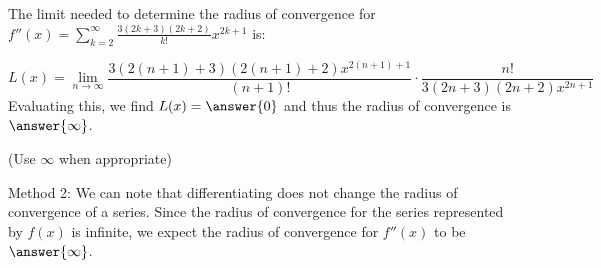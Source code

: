 \documentclass{ximera}
\begin{document}
\begin{exercise}
\begin{exercise}
\begin{exercise}
\begin{exercise}
The limit needed to determine the radius of convergence for $f''(x) = \sum_{k=2}^{\infty} \frac{3(2k+3)(2k+2)}{k!}x^{2k+1}$ is:

\[
L(x) = \lim_{n \to \infty} \frac{3(2(n+1)+3)(2(n+1)+2)x^{2(n+1)+1}}{(n+1)!} \cdot \frac{n!}{3(2n+3)(2n+2)x^{2n+1}}
\]
Evaluating this, we find $L(x) = \answer{0}$ and thus the radius of convergence is $\answer{\infty}$.

(Use $\infty$ when appropriate)
\end{exercise}

\begin{exercise}
Method 2: We can note that differentiating does not change the radius of convergence of a series.  Since the radius of convergence for the series represented by $f(x)$ is infinite, we expect the radius of convergence for $f''(x)$ to be $\answer{\infty}$.
\end{exercise}
\end{exercise}
\end{exercise}
\end{exercise}
\end{document}
